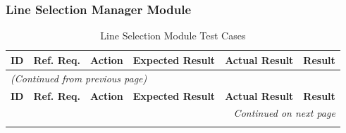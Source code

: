\documentclass[12pt, titlepage]{article}
\begin{document}
\subsubsection{Line Selection Manager Module}
\begin{longtable}{c 
  >{\raggedright\arraybackslash}p{1.5cm} 
  >{\raggedright\arraybackslash}p{4.5cm} 
  >{\raggedright\arraybackslash}p{4cm} 
  >{\raggedright\arraybackslash}p{3cm} c}
  \toprule
  \textbf{ID} & \textbf{Ref. Req.} & \textbf{Action} & \textbf{Expected Result} & \textbf{Actual Result} & \textbf{Result} \\ 
  \midrule
  \endfirsthead

  \multicolumn{6}{l}{\textit{(Continued from previous page)}} \\ 
  \toprule
  \textbf{ID} & \textbf{Ref. Req.} & \textbf{Action} & \textbf{Expected Result} & \textbf{Actual Result} & \textbf{Result} \\ 
  \midrule
  \endhead

  \multicolumn{6}{r}{\textit{Continued on next page}} \\
  \endfoot

  \bottomrule
  \caption{Line Selection Module Test Cases}
  \label{table:line_selection_tests}
  \endlastfoot


\end{longtable}
\end{document}
